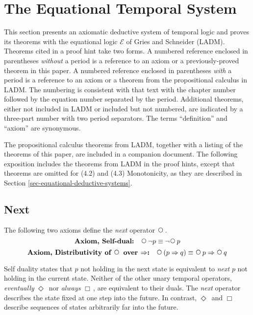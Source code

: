 \documentclass[12pt, fleqn, leqno]{article}
\newcommand{\impl}{\ensuremath{\Rightarrow}}        %
\newcommand{\Next}{\;\,\text{\raisebox{3.5pt}{\circle{6}}}}
\newcommand{\Event}{\Diamond\,}
\newcommand{\Always}{\Box\,}
\begin{document}
\section{The Equational Temporal System}

This section presents an axiomatic deductive system of temporal logic and proves its theorems with the equational
logic $\mathcal{E}$ of Gries and Schneider \cite{LADM} (LADM).
Theorems cited in a proof hint take two forms.
A numbered reference enclosed in parentheses \textit{without} a period is a reference to an axiom or a previously-proved
theorem in this paper.
A numbered reference enclosed in parentheses \textit{with} a period is a reference to an axiom or a
theorem from the propositional calculus in LADM.
The numbering is consistent with that text with the chapter number followed by the equation number separated by the period.
Additional theorems, either not included in LADM or included but not numbered, are indicated by a three-part number with two period separators.
The terms ``definition'' and ``axiom'' are synonymous.

The propositional calculus theorems from LADM, together with a listing of the theorems of this paper, are included in a companion document. \cite{vegaTheorems}
The following exposition includes the theorems from LADM in the proof hints, except that theorems are omitted for (4.2) and (4.3) Monotonicity, as they are described in Section \ref{sec-equational-deductive-systems}.

\subsection{Next}\label{section-next}

The following two axioms define the \textit{next} operator $\Next$.
\begin{equation}\label{E:selfDual}
\textbf{Axiom, Self-dual:}\quad \Next\neg p \equiv \neg\Next p
\end{equation}
\begin{equation}\label{E:distNextImp}
\textbf{Axiom, Distributivity of $\Next$ over $\impl$:}\quad \Next (p \impl q) \equiv \Next p \impl \Next q
\end{equation}

Self duality states that $p$ not holding in the next state is equivalent to \textit{next} $p$ not holding in the current state.
Neither of the other unary temporal operators, \textit{eventually} $\Event$ nor \textit{always} $\Always$, are equivalent to their duals.
The \textit{next} operator describes the state fixed at one step into the future.
In contrast, $\Event$ and $\Always$ describe sequences of states arbitrarily far into the future.
\end{document}
